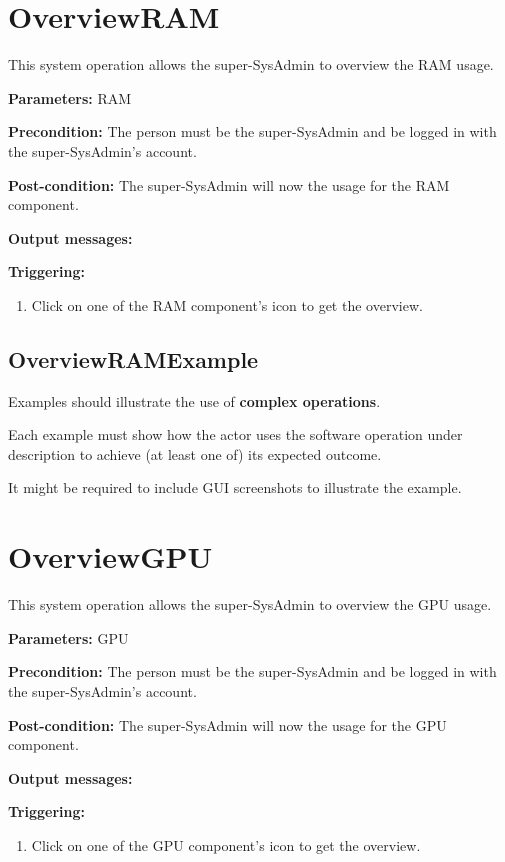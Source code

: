 \section{OverviewRAM}
\label{operation:overviewram}
This system operation allows the super-SysAdmin to overview the RAM usage.

\begin{description}

\item \textbf{Parameters:} RAM
\item \textbf{Precondition:} The person must be the super-SysAdmin and be logged
in with the super-SysAdmin's account.
\item \textbf{Post-condition:} The super-SysAdmin will now the usage for the RAM
component.
\item \textbf{Output messages:}

\item \textbf{Triggering:}
\begin{enumerate}
\item Click on one of the RAM component's icon to get the overview. 
\end{enumerate}

 
\end{description}

\subsection{OverviewRAMExample}
Examples should illustrate the use of \textbf{complex operations}.

Each example must show how the actor uses the software operation under
description to achieve (at least one of) its expected outcome.

It might be required to include GUI screenshots to illustrate the example.
 
 
 
 
 
 
 \section{OverviewGPU}
 \label{operation:overviewgpu}
This system operation allows the super-SysAdmin to overview the GPU usage.

\begin{description}

\item \textbf{Parameters:} GPU
\item \textbf{Precondition:} The person must be the super-SysAdmin and be logged
in with the super-SysAdmin's account.
\item \textbf{Post-condition:} The super-SysAdmin will now the usage for the GPU
component.
\item \textbf{Output messages:}

\item \textbf{Triggering:}
\begin{enumerate}
\item Click on one of the GPU component's icon to get the overview. 
\end{enumerate}

 
\end{description}
 
